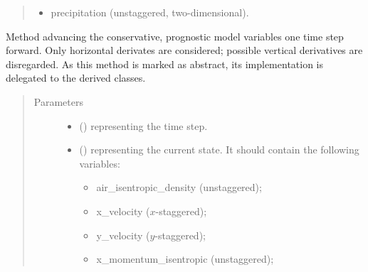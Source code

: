 \documentclass[letterpaper,10pt,english]{sphinxmanual}
\begin{document}
\begin{fulllineitems}
\begin{fulllineitems}
\begin{quote}
\begin{description}
\begin{itemize}
\begin{itemize}
\item {} 
precipitation (unstaggered, two-dimensional).

\end{itemize}

\end{itemize}


\end{description}\end{quote}

\end{fulllineitems}


\begin{fulllineitems}
\label{\detokenize{api:dycore.prognostic_isentropic.PrognosticIsentropic.step_neglecting_vertical_advection}}
Method advancing the conservative, prognostic model variables one time step forward.
Only horizontal derivates are considered; possible vertical derivatives are disregarded.
As this method is marked as abstract, its implementation is delegated to the derived classes.
\begin{quote}\begin{description}
\item[{Parameters}] \leavevmode\begin{itemize}
\item {} 
 () \textendash{}  representing the time step.

\item {} 
 () \textendash{} 
{\hyperref[\detokenize{api:storages.state_isentropic.StateIsentropic}]{}} representing the current state.
It should contain the following variables:
\begin{itemize}
\item {} 
air\_isentropic\_density (unstaggered);

\item {} 
x\_velocity (\(x\)-staggered);

\item {} 
y\_velocity (\(y\)-staggered);

\item {} 
x\_momentum\_isentropic (unstaggered);


\end{itemize}
\end{itemize}
\end{description}
\end{quote}
\end{fulllineitems}
\end{fulllineitems}
\end{document}
